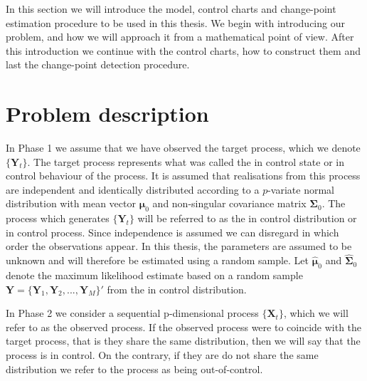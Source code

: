 In this section we will introduce the model, control charts and change-point estimation procedure to be used in this thesis. We begin with introducing our problem, and how we will approach it from a mathematical point of view. After this introduction we continue with the control charts, how to construct them and last the change-point detection procedure.

\section{Problem description}
In Phase 1 we assume that we have observed the target process, which we denote $\{\mathbf{Y}_t\}$. The target process represents what was called the in control state or in control behaviour of the process. It is assumed that realisations from this process are independent and identically distributed according to a $p$-variate normal distribution with mean vector $\boldsymbol{\mu}_0$ and non-singular covariance matrix $\boldsymbol{\Sigma}_0$. The process which generates $\{\mathbf{Y}_t\}$ will be referred to as the in control distribution or in control process. Since independence is assumed we can disregard in which order the observations appear. In this thesis, the parameters are assumed to be unknown and will therefore be estimated using a random sample. Let $\hat{\boldsymbol{\mu}}_0$ and $\widehat{\boldsymbol{\Sigma}}_0$ denote the maximum likelihood estimate based on a random sample $\mathbf{Y}=\{\mathbf{Y}_1,\mathbf{Y}_2,...,\mathbf{Y}_M\}'$ from the in control distribution.

In Phase 2 we consider a sequential p-dimensional process $\{\mathbf{X}_t\}$, which we will refer to as the observed process. If the observed process were to coincide with the target process, that is they share the same distribution, then we will say that the process is in control. On the contrary, if they are do not share the same distribution we refer to the process as being out-of-control. 

